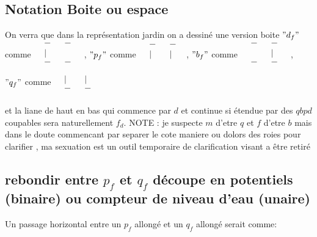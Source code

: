 \documentclass{article}
\begin{document}
\subsection{Notation Boite ou espace}
On verra que dans la représentation jardin on a dessiné  une version  boite 
$"d_f"$ comme  $\begin{matrix}
  &-&&-&\\
  &|&&&\\
  &-&&-&\\
  \end{matrix}
  $   , $"p_f"$ comme 
 $\begin{matrix}
  &-&&-&\\
  &|&&|&\\
  &&&&\\
 \end{matrix}$, $"b_f"$ comme  $\begin{matrix}
  &-&&-&\\
  &&&|&\\
  &-&&-&\\
  \end{matrix}
  $   , $"q_f"$ comme 
 $\begin{matrix}
  &&&&\\
  &|&&|&\\
  &-&&-&\\
 \end{matrix}$

et la liane de haut en bas qui commence par $d$ et continue si étendue par  des $qbpd$ coupables sera naturellement $f_d$.
NOTE : je suspecte $m$ d'etre $q$ et $f$ d'etre $b$ mais dans le doute commencant par separer le cote maniere ou dolors des roies pour clarifier , ma sexuation est un outil temporaire de clarification visant a être retiré
 \subsection{ rebondir entre  $p_f$ et $q_f$ découpe en potentiels (binaire) ou compteur de niveau d'eau (unaire)}
 Un passage horizontal entre un $p_f$ allongé et un $q_f$ allongé serait comme:
  
\end{document}
